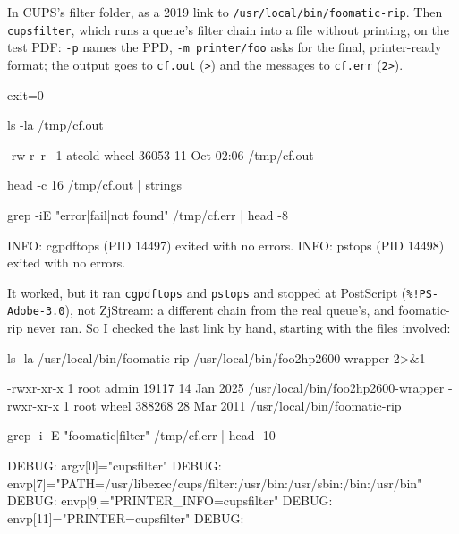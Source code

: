 \documentclass[11pt,a4paper]{article}
\begin{document}
In CUPS's filter folder, as a 2019 link to \texttt{/usr/local/bin/foomatic-rip}. Then \texttt{cupsfilter}, which runs a queue's filter chain into a file without printing, on the test PDF: \texttt{-p} names the PPD, \texttt{-m printer/foo} asks for the final, printer-ready format; the output goes to \texttt{cf.out} (\texttt{>}) and the messages to \texttt{cf.err} (\texttt{2>}).

\begin{cmdout}
exit=0
\end{cmdout}
\begin{mine}
ls -la /tmp/cf.out
\end{mine}
\begin{cmdout}
-rw-r--r--  1 atcold  wheel  36053 11 Oct 02:06 /tmp/cf.out
\end{cmdout}
\begin{mine}
head -c 16 /tmp/cf.out | strings
\end{mine}
\begin{cmdout}
\end{cmdout}
\begin{mine}
grep -iE "error|fail|not found" /tmp/cf.err | head -8
\end{mine}
\begin{cmdout}
INFO: cgpdftops (PID 14497) exited with no errors.
INFO: pstops (PID 14498) exited with no errors.
\end{cmdout}

It worked, but it ran \texttt{cgpdftops} and \texttt{pstops} and stopped at PostScript (\texttt{\%!PS-Adobe-3.0}), not ZjStream: a different chain from the real queue's, and foomatic-rip never ran. So I checked the last link by hand, starting with the files involved:

\begin{mine}
ls -la /usr/local/bin/foomatic-rip /usr/local/bin/foo2hp2600-wrapper 2>&1
\end{mine}
\begin{cmdout}
-rwxr-xr-x  1 root  admin   19117 14 Jan  2025 /usr/local/bin/foo2hp2600-wrapper
-rwxr-xr-x  1 root  wheel  388268 28 Mar  2011 /usr/local/bin/foomatic-rip
\end{cmdout}
\begin{mine}
grep -i -E "foomatic|filter" /tmp/cf.err | head -10
\end{mine}
\begin{cmdout}
DEBUG: argv[0]="cupsfilter"
DEBUG: envp[7]="PATH=/usr/libexec/cups/filter:/usr/bin:/usr/sbin:/bin:/usr/bin"
DEBUG: envp[9]="PRINTER_INFO=cupsfilter"
DEBUG: envp[11]="PRINTER=cupsfilter"
DEBUG: %
\end{cmdout}
\end{document}
